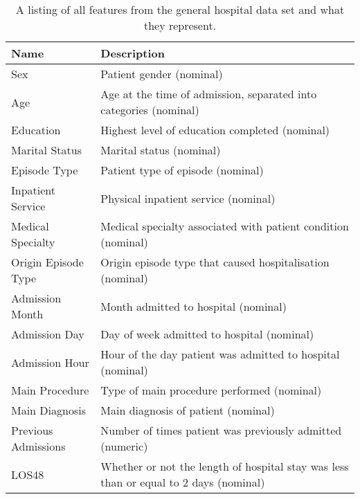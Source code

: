 \begin{table}[htbp]
\begin{tabular}{ll}
\textbf{Name} & \textbf{Description} \\ 
\hline
Sex & Patient gender (nominal) \\ 
Age & Age at the time of admission, separated into categories (nominal) \\ 
Education & Highest level of education completed (nominal) \\ 
Marital Status & Marital status (nominal) \\ 
Episode Type & Patient type of episode (nominal) \\ 
Inpatient Service & Physical inpatient service (nominal) \\ 
Medical Specialty & Medical specialty associated with patient condition (nominal) \\ 
Origin Episode Type & Origin episode type that caused hospitalisation (nominal) \\ 
Admission Month & Month admitted to hospital (nominal) \\ 
Admission Day & Day of week admitted to hospital (nominal) \\ 
Admission Hour & Hour of the day patient was admitted to hospital (nominal) \\ 
Main Procedure & Type of main procedure performed (nominal) \\ 
Main Diagnosis & Main diagnosis of patient (nominal) \\ 
Previous Admissions & Number of times patient was previously admitted (numeric) \\ 
LOS48 & Whether or not the length of hospital stay was less than or equal to 2 days (nominal) \\ 
\end{tabular}
\caption{A listing of all features from the general hospital data set and what they represent.}
\label{tab:feature-desc-pt}
\end{table}
